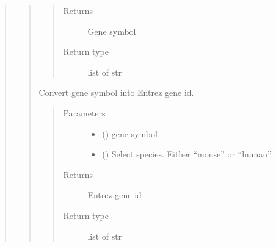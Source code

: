 \documentclass[letterpaper,10pt,english]{sphinxmanual}
\begin{document}
\begin{quote}
\begin{quote}
\begin{fulllineitems}
\begin{quote}
\begin{description}
\item[{Returns}] \leavevmode
Gene symbol

\item[{Return type}] \leavevmode
list of str

\end{description}\end{quote}

\end{fulllineitems}


\begin{fulllineitems}
\label{\detokenize{modules/celloracle.go_analysis:celloracle.go_analysis.geneSymbol2ID}}
Convert gene symbol into Entrez gene id.
\begin{quote}\begin{description}
\item[{Parameters}] \leavevmode\begin{itemize}
\item {} 
 () \textendash{} gene symbol

\item {} 
 () \textendash{} Select species. Either “mouse” or “human”

\end{itemize}

\item[{Returns}] \leavevmode
Entrez gene id

\item[{Return type}] \leavevmode
list of str

\end{description}\end{quote}

\end{fulllineitems}



\end{quote}
\end{quote}
\end{document}
